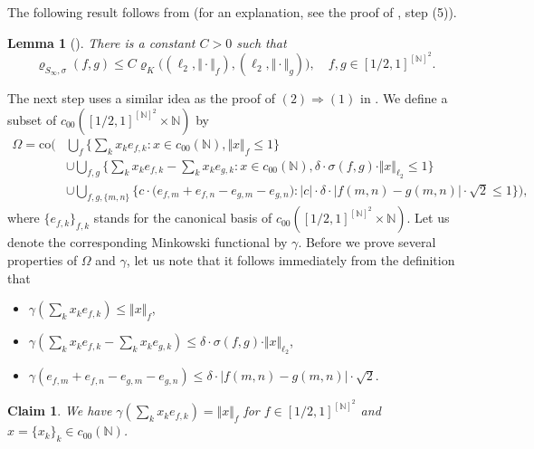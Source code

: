\documentclass[a4paper]{amsart}
\theoremstyle{plain}
\newtheorem{lemma}[theorem]{Lemma}
\newtheorem{claim}[theorem]{Claim}
\theoremstyle{remark}
\begin{document}
The following result follows from \cite[Lemma~51]{cdk2} (for an explanation, see the proof of \cite[Theorem~48]{cdk2}, step (5)).


\begin{lemma}[\cite{cdk2}] \label{lemmacdk}
There is a constant $ C > 0 $ such that
$$ \varrho_{S_{\infty}, \sigma}(f, g) \leq C \varrho_{K} \big( (\ell_{2}, \Vert \cdot \Vert_{f}), (\ell_{2}, \Vert \cdot \Vert_{g}) \big), \quad f, g \in [1/2, 1]^{[\mathbb{N}]^{2}}. $$
\end{lemma}


The next step uses a similar idea as the proof of $ (2) \Rightarrow (1) $ in \cite[Proposition~3.15]{cddk}. We define a subset of $ c_{00}([1/2, 1]^{[\mathbb{N}]^{2}} \times \mathbb{N}) $ by
\begin{align*}
\Omega = \mathrm{co} \bigg( & \bigcup_{f} \Big\{ \sum_{k} x_{k} e_{f, k} : x \in c_{00}(\mathbb{N}), \Vert x \Vert_{f} \leq 1 \Big\} \\
 & \cup \bigcup_{f, g} \Big\{ \sum_{k} x_{k} e_{f, k} - \sum_{k} x_{k} e_{g, k} : x \in c_{00}(\mathbb{N}), \delta \cdot \sigma(f, g) \cdot \Vert x \Vert_{\ell_{2}} \leq 1 \Big\} \\
 & \cup \bigcup_{f, g, \{ m, n \} } \Big\{ c \cdot \big( e_{f, m} + e_{f, n} - e_{g, m} - e_{g, n} \big) : |c| \cdot \delta \cdot |f(m, n) - g(m, n)| \cdot \sqrt{2} \leq 1 \Big\} \bigg),
\end{align*}
where $ \{ e_{f, k} \}_{f, k} $ stands for the canonical basis of $ c_{00}([1/2, 1]^{[\mathbb{N}]^{2}} \times \mathbb{N}) $. Let us denote the corresponding Minkowski functional by $ \gamma $. Before we prove several properties of $ \Omega $ and $ \gamma $, let us note that it follows immediately from the definition that
\begin{itemize}
\item $ \gamma(\sum_{k} x_{k} e_{f, k}) \leq \Vert x \Vert_{f} $,
\item $ \gamma(\sum_{k} x_{k} e_{f, k} - \sum_{k} x_{k} e_{g, k}) \leq \delta \cdot \sigma(f, g) \cdot \Vert x \Vert_{\ell_{2}} $,
\item $ \gamma(e_{f, m} + e_{f, n} - e_{g, m} - e_{g, n}) \leq \delta \cdot |f(m, n) - g(m, n)| \cdot \sqrt{2} $.
\end{itemize}


\begin{claim} \label{clapp1}
We have $ \gamma(\sum_{k} x_{k} e_{f, k}) = \Vert x \Vert_{f} $ for $ f \in [1/2, 1]^{[\mathbb{N}]^{2}} $ and $ x = \{ x_{k} \}_{k} \in c_{00}(\mathbb{N}) $.
\end{claim}
\end{document}
